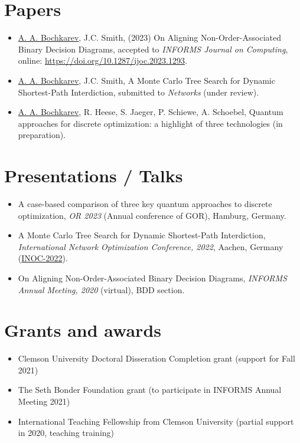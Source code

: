 \documentclass[11pt, a4paper]{article} \usepackage{geometry} %
\begin{document}
 \section*{Papers}
 \begin{itemize}
    \itemsep0pt
    \item \underline{A. A. Bochkarev}, J.C. Smith, (2023) On Aligning
    Non-Order-Associated Binary Decision Diagrams, accepted to \textit{INFORMS Journal on Computing}, online: \href{https://doi.org/10.1287/ijoc.2023.1293}{https://doi.org/10.1287/ijoc.2023.1293}.
  \item \underline{A. A. Bochkarev}, J.C. Smith, A Monte Carlo Tree Search for
    Dynamic Shortest-Path Interdiction, submitted to \textit{Networks} (under review).
  \item \underline{A. A. Bochkarev}, R. Heese, S. Jaeger, P. Schiewe, A. Schoebel, Quantum approaches for discrete optimization: a highlight of three technologies (in preparation).
 \end{itemize}
 \section*{Presentations / Talks}
 \begin{itemize}
   \itemsep0pt
   \item A case-based comparison of three key quantum approaches to discrete
         optimization, \textit{OR 2023} (Annual conference of GOR), Hamburg, Germany.
 \item A Monte Carlo Tree Search for Dynamic Shortest-Path Interdiction,
   \textit{International Network Optimization Conference, 2022}, Aachen, Germany
   (\href{https://sites.google.com/view/inoc2022/schedule}{INOC-2022}).
 \item On Aligning Non-Order-Associated Binary Decision Diagrams, \textit{INFORMS Annual
   Meeting, 2020} (virtual), BDD section.
 \end{itemize}

 \section*{Grants and awards}
 \begin{itemize}
 \itemsep0pt 
    \item Clemson University Doctoral Disseration Completion grant (support for Fall 2021)
    \item The Seth Bonder Foundation grant (to participate in INFORMS Annual Meeting 2021)
    \item International Teaching Fellowship from Clemson University (partial
      support in 2020, teaching training)
 \end{itemize}
\end{document}
